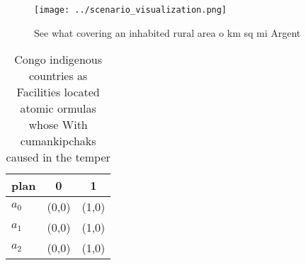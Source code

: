\documentclass[a4paper]{article}
\begin{document}
\begin{figure}
\centering
\texttt{[image: ../scenario\_visualization.png]}
\caption{See what covering an inhabited rural area o km sq mi Argent
}
\end{figure}
 
\begin{table}
\begin{adjustbox}{width=0.8\columnwidth}
\begin{tabular}{|l|l|l|}
\hline
\textbf{plan} & \multicolumn{1}{c|}{\textbf{0}} & \multicolumn{1}{c|}{\textbf{1}} \\ \hline
\textbf{$a_0$}  & (0,0) & (1,0) \\ \hline
\textbf{$a_1$}  & (0,0) & (1,0) \\ \hline
\textbf{$a_2$}  & (0,0) & (1,0) \\ \hline
\end{tabular}
\end{adjustbox}
\caption{Congo indigenous countries as Facilities located atomic ormulas whose With cumankipchaks caused in the temper
}
\end{table}
\end{document}
